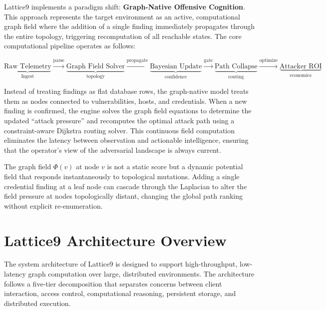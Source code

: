 \documentclass[11pt,a4paper]{article}
\theoremstyle{definition}
\numberwithin{equation}{section}
\newcommand{\field}[1]{\Phi(#1)}
\begin{document}
Lattice9 implements a paradigm shift: \textbf{Graph-Native Offensive Cognition}. This approach represents the target environment as an active, computational graph field where the addition of a single finding immediately propagates through the entire topology, triggering recomputation of all reachable states. The core computational pipeline operates as follows:

\begin{equation}\label{eq:pipeline}
\underbrace{\text{Raw Telemetry}}_{\text{Ingest}} \xrightarrow{\text{parse}} \underbrace{\text{Graph Field Solver}}_{\text{topology}} \xrightarrow{\text{propagate}} \underbrace{\text{Bayesian Update}}_{\text{confidence}} \xrightarrow{\text{gate}} \underbrace{\text{Path Collapse}}_{\text{routing}} \xrightarrow{\text{optimize}} \underbrace{\text{Attacker ROI}}_{\text{economics}}
\end{equation}

Instead of treating findings as flat database rows, the graph-native model treats them as nodes connected to vulnerabilities, hosts, and credentials. When a new finding is confirmed, the engine solves the graph field equations to determine the updated ``attack pressure'' and recomputes the optimal attack path using a constraint-aware Dijkstra routing solver. This continuous field computation eliminates the latency between observation and actionable intelligence, ensuring that the operator's view of the adversarial landscape is always current.

\begin{graphinsight}
The graph field $\field{v}$ at node $v$ is not a static score but a dynamic potential field that responds instantaneously to topological mutations. Adding a single credential finding at a leaf node can cascade through the Laplacian to alter the field pressure at nodes topologically distant, changing the global path ranking without explicit re-enumeration.
\end{graphinsight}

\section{Lattice9 Architecture Overview}\label{sec:architecture}

The system architecture of Lattice9 is designed to support high-throughput, low-latency graph computation over large, distributed environments. The architecture follows a five-tier decomposition that separates concerns between client interaction, access control, computational reasoning, persistent storage, and distributed execution.
\end{document}
